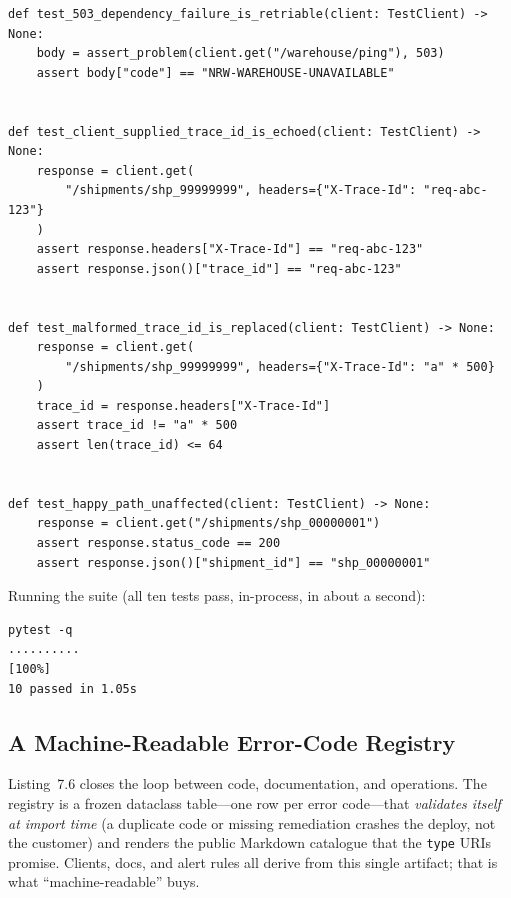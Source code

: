 \begin{verbatim}
def test_503_dependency_failure_is_retriable(client: TestClient) -> None:
    body = assert_problem(client.get("/warehouse/ping"), 503)
    assert body["code"] == "NRW-WAREHOUSE-UNAVAILABLE"


def test_client_supplied_trace_id_is_echoed(client: TestClient) -> None:
    response = client.get(
        "/shipments/shp_99999999", headers={"X-Trace-Id": "req-abc-123"}
    )
    assert response.headers["X-Trace-Id"] == "req-abc-123"
    assert response.json()["trace_id"] == "req-abc-123"


def test_malformed_trace_id_is_replaced(client: TestClient) -> None:
    response = client.get(
        "/shipments/shp_99999999", headers={"X-Trace-Id": "a" * 500}
    )
    trace_id = response.headers["X-Trace-Id"]
    assert trace_id != "a" * 500
    assert len(trace_id) <= 64


def test_happy_path_unaffected(client: TestClient) -> None:
    response = client.get("/shipments/shp_00000001")
    assert response.status_code == 200
    assert response.json()["shipment_id"] == "shp_00000001"
\end{verbatim}

Running the suite (all ten tests pass, in-process, in about a second):

\begin{verbatim}
pytest -q
..........                                                               [100%]
10 passed in 1.05s
\end{verbatim}

\subsection{A Machine-Readable Error-Code Registry}

Listing~7.6 closes the loop between code, documentation, and operations. The
registry is a frozen dataclass table---one row per error code---that
\emph{validates itself at import time} (a duplicate code or missing
remediation crashes the deploy, not the customer) and renders the public
Markdown catalogue that the \texttt{type} URIs promise. Clients, docs, and
alert rules all derive from this single artifact; that is what
``machine-readable'' buys.

